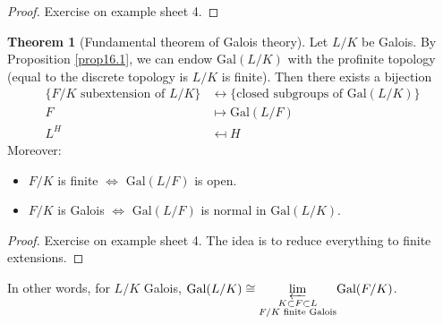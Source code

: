 \documentclass{article}
\theoremstyle{definition}
\newtheorem{theorem}{Theorem}[section]
\begin{document}
\begin{proof}
    Exercise on example sheet 4.
\end{proof}
\begin{theorem}[Fundamental theorem of Galois theory]\label{theorem16.2}
    Let $L/K$ be Galois. By Proposition \ref{prop16.1}, we can endow $\text{Gal}(L/K)$ with the profinite topology (equal to the discrete topology is $L/K$ is finite). Then there exists a bijection 
    \begin{align*}
        \{F/K \text{ subextension of }L/K\} &\leftrightarrow \{\text{closed subgroups of }\text{Gal}(L/K)\}\\
        F &\mapsto \text{Gal}(L/F)\\
        L^H &\mapsfrom H
    \end{align*}
    Moreover:
    \begin{itemize}
        \item $F/K$ is finite $\iff$ $\text{Gal}(L/F)$ is open.
        \item $F/K$ is Galois $\iff$ $\text{Gal}(L/F)$ is normal in $\text{Gal}(L/K)$.
    \end{itemize}
\end{theorem}
\begin{proof}
    Exercise on example sheet 4. The idea is to reduce everything to finite extensions.
\end{proof}

In other words, for $L/K$ Galois, $\text{Gal}(L/K) \cong \underset{\substack{K \subset F \subset L\\F/K \text{ finite Galois}}}{\varprojlim} \text{Gal}(F/K)$.
\end{document}
